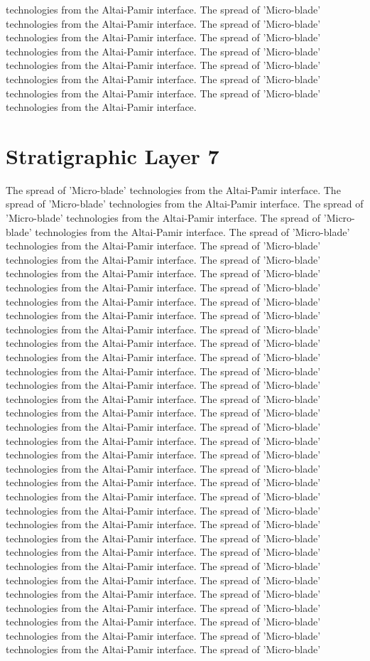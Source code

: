technologies from the Altai-Pamir interface. The spread of 'Micro-blade' technologies from the Altai-Pamir interface. The spread of 'Micro-blade' technologies from the Altai-Pamir interface. The spread of 'Micro-blade' technologies from the Altai-Pamir interface. The spread of 'Micro-blade' technologies from the Altai-Pamir interface. The spread of 'Micro-blade' technologies from the Altai-Pamir interface. The spread of 'Micro-blade' technologies from the Altai-Pamir interface. The spread of 'Micro-blade' technologies from the Altai-Pamir interface. 

\section{Stratigraphic Layer 7}
The spread of 'Micro-blade' technologies from the Altai-Pamir interface. The spread of 'Micro-blade' technologies from the Altai-Pamir interface. The spread of 'Micro-blade' technologies from the Altai-Pamir interface. The spread of 'Micro-blade' technologies from the Altai-Pamir interface. The spread of 'Micro-blade' technologies from the Altai-Pamir interface. The spread of 'Micro-blade' technologies from the Altai-Pamir interface. The spread of 'Micro-blade' technologies from the Altai-Pamir interface. The spread of 'Micro-blade' technologies from the Altai-Pamir interface. The spread of 'Micro-blade' technologies from the Altai-Pamir interface. The spread of 'Micro-blade' technologies from the Altai-Pamir interface. The spread of 'Micro-blade' technologies from the Altai-Pamir interface. The spread of 'Micro-blade' technologies from the Altai-Pamir interface. The spread of 'Micro-blade' technologies from the Altai-Pamir interface. The spread of 'Micro-blade' technologies from the Altai-Pamir interface. The spread of 'Micro-blade' technologies from the Altai-Pamir interface. The spread of 'Micro-blade' technologies from the Altai-Pamir interface. The spread of 'Micro-blade' technologies from the Altai-Pamir interface. The spread of 'Micro-blade' technologies from the Altai-Pamir interface. The spread of 'Micro-blade' technologies from the Altai-Pamir interface. The spread of 'Micro-blade' technologies from the Altai-Pamir interface. The spread of 'Micro-blade' technologies from the Altai-Pamir interface. The spread of 'Micro-blade' technologies from the Altai-Pamir interface. The spread of 'Micro-blade' technologies from the Altai-Pamir interface. The spread of 'Micro-blade' technologies from the Altai-Pamir interface. The spread of 'Micro-blade' technologies from the Altai-Pamir interface. The spread of 'Micro-blade' technologies from the Altai-Pamir interface. The spread of 'Micro-blade' technologies from the Altai-Pamir interface. The spread of 'Micro-blade' technologies from the Altai-Pamir interface. The spread of 'Micro-blade' technologies from the Altai-Pamir interface. The spread of 'Micro-blade' technologies from the Altai-Pamir interface. The spread of 'Micro-blade' technologies from the Altai-Pamir interface. The spread of 'Micro-blade' technologies from the Altai-Pamir interface. The spread of 'Micro-blade' technologies from the Altai-Pamir interface. The spread of 'Micro-blade' technologies from the Altai-Pamir interface. The spread of 'Micro-blade' 